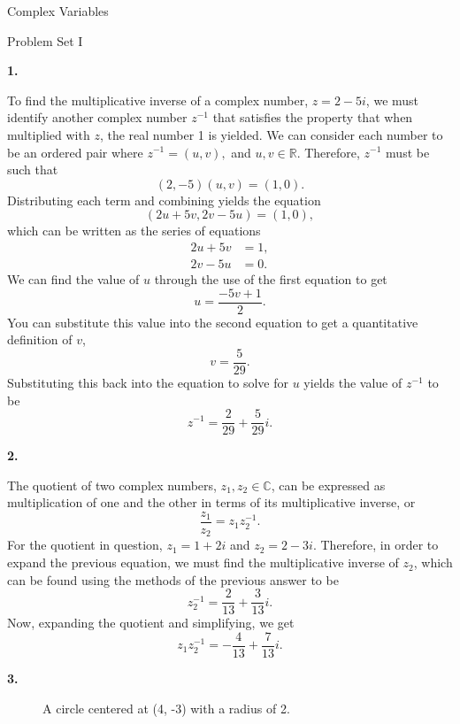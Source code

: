 \documentclass{article}
\newcommand{\qnumber}[1]{
\vspace{0.5cm}
\noindent
\textbf{#1.}
\vspace{4mm}
}
\begin{document}
\begin{center}
    \huge Complex Variables
    
    \large Problem Set I
    \thispagestyle{plain}
\end{center}

\qnumber{1}

To find the multiplicative inverse of a complex number, $z=2-5i$, we must identify another complex number $z^{-1}$ that satisfies the property that when multiplied with $z$, the real number 1 is yielded. We can consider each number to be an ordered pair where $z^{-1}=(u, v),$ and $u,v\in\mathbb{R}$. Therefore, $z^{-1}$ must be such that
\[
    (2,-5)(u,v)=(1,0).  
\]
Distributing each term and combining yields the equation
\[
    (2u+5v, 2v-5u)=(1,0),
\]
which can be written as the series of equations
\[
\begin{split}
    2u+5v&=1, \\
    2v-5u&=0.
\end{split}
\]
We can find the value of $u$ through the use of the first equation to get
\[
    u=\frac{-5v+1}{2}.  
\]
You can substitute this value into the second equation to get a quantitative definition of $v$,
\[
    v=\frac{5}{29}.  
\]
Substituting this back into the equation to solve for $u$ yields the value of $z^{-1}$ to be
\[
    z^{-1}=\frac{2}{29}+\frac{5}{29}i.  
\]

\qnumber{2}

The quotient of two complex numbers, $z_1, z_2\in\mathbb{C}$,  can be expressed as multiplication of one and the other in terms of its multiplicative inverse, or
\[
    \frac{z_1}{z_2}=z_1 z_2^{-1}.
\]
For the quotient in question, $z_1=1+2i$ and $z_2=2-3i$. Therefore, in order to expand the previous equation, we must find the multiplicative inverse of $z_2$, which can be found using the methods of the previous answer to be
\[
    z_2^{-1}=\frac{2}{13}+\frac{3}{13}i.  
\]
Now, expanding the quotient and simplifying, we get
\[
    z_1 z_2^{-1}=-\frac{4}{13} + \frac{7}{13}i.
\]

\qnumber{3}

\begin{figure}[h]
    \centering


    \caption{A circle centered at (4, -3) with a radius of 2.}
\end{figure}
\end{document}
